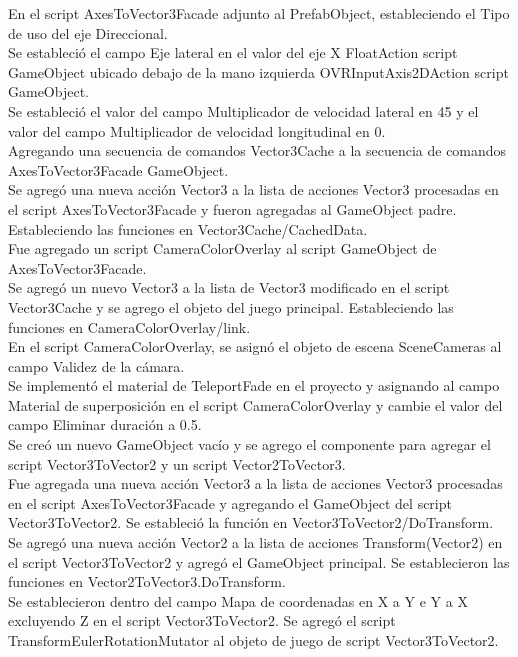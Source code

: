 En el script AxesToVector3Facade adjunto al PrefabObject, estableciendo el Tipo de uso del eje Direccional.\\
Se  estableció el campo Eje lateral en el valor del eje X FloatAction script GameObject ubicado debajo de la mano izquierda OVRInputAxis2DAction script GameObject.\\
Se estableció el valor del campo Multiplicador de velocidad lateral en 45 y el valor del campo Multiplicador de velocidad longitudinal en 0.\\
Agregando una secuencia de comandos Vector3Cache a la secuencia de comandos AxesToVector3Facade GameObject.\\
Se agregó una nueva acción Vector3 a la lista de acciones Vector3 procesadas en el script AxesToVector3Facade y fueron agregadas al GameObject padre. 
Estableciendo las funciones en Vector3Cache/CachedData.\\
Fue agregado un script CameraColorOverlay al script GameObject de AxesToVector3Facade.\\
Se agregó un nuevo Vector3 a la lista de Vector3 modificado en el script Vector3Cache y  se agrego el objeto del juego principal. Estableciendo las funciones en CameraColorOverlay/link.\\
En el script CameraColorOverlay, se asignó el objeto de escena SceneCameras al campo Validez de la cámara.\\
Se implementó el material de TeleportFade en el proyecto y asignando al campo Material de superposición en el script CameraColorOverlay y cambie el valor del campo Eliminar duración a 0.5.\\
Se creó un nuevo GameObject vacío y se agrego el componente para agregar el script Vector3ToVector2 y un script Vector2ToVector3.\\
Fue agregada una nueva acción Vector3 a la lista de acciones Vector3 procesadas en el script AxesToVector3Facade y agregando el GameObject del script Vector3ToVector2. Se estableció la 
función en Vector3ToVector2/DoTransform.\\
Se agregó una nueva acción Vector2 a la lista de acciones Transform(Vector2) en el script Vector3ToVector2 y agregó el GameObject principal. Se establecieron las funciones en 
Vector2ToVector3\/.DoTransform.\\
Se establecieron dentro del campo Mapa de coordenadas en X a Y e Y a X excluyendo Z en el script Vector3ToVector2. Se agregó el script TransformEulerRotationMutator al objeto de 
juego de script Vector3ToVector2.\\
